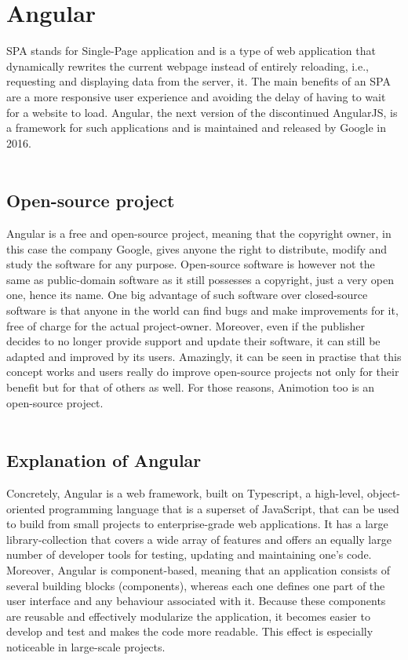 \section{Angular}
SPA stands for Single-Page application and is a type of web application that dynamically rewrites the 
current webpage instead of entirely reloading, i.e., requesting and displaying data from the server, it. 
The main benefits of an SPA are a more responsive user experience and avoiding the delay of having to wait 
for a website to load. Angular, the next version of the discontinued AngularJS, is a framework for such 
applications and is maintained and released by Google in 2016.
\\
\\
\subsection{Open-source project}
Angular is a free and open-source project, meaning that the copyright owner, in this case the company Google,
gives anyone the right to distribute, modify and study the software for any purpose. Open-source software is 
however not the same as public-domain software as it still possesses a copyright, just a very open one, hence its name. 
One big advantage of such software over closed-source software is that anyone in the world can find bugs and make 
improvements for it, free of charge for the actual project-owner. Moreover, even if the publisher decides to no longer 
provide support and update their software, it can still be adapted and improved by its users. Amazingly, it can be seen 
in practise that this concept works and users really do improve open-source projects not only for their benefit but for 
that of others as well. For those reasons, Animotion too is an open-source project.\cite{Opensource}
\\
\\
\subsection{Explanation of Angular}
Concretely, Angular is a web framework, built on Typescript, a high-level, object-oriented programming language that is 
a superset of JavaScript, that can be used to build from small projects to enterprise-grade web applications. It has a 
large library-collection that covers a wide array of features and offers an equally large number of developer tools for 
testing, updating and maintaining one's code. Moreover, Angular is component-based, meaning that an application consists 
of several building blocks (components), whereas each one defines one part of the user interface and any behaviour associated 
with it. Because these components are reusable and effectively modularize the application, it becomes easier to develop and 
test and makes the code more readable. This effect is especially noticeable in large-scale projects. \cite{AngularDescription}
\\
\\
